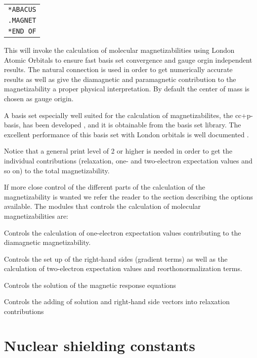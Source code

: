 \smallskip

\begin{tabular}{l}
\verb|*ABACUS|\\
\verb|.MAGNET|\\
\verb|*END OF|
\end{tabular}

\smallskip

This will invoke the calculation of molecular magnetizabilities using
London Atomic Orbitals to ensure fast basis set convergence and gauge
orgin independent results. The natural connection \cite{joklbkrthpj}
is used in order to get numerically accurate results as well as give
the diamagnetic and paramagnetic contribution to the magnetizability a
proper physical interpretation. By default the center of mass is
chosen as gauge origin.

A basis set especially well suited for the calculation of
magnetizabilites, the cc+p-basis, has been developed
\cite{pdkrthklbpj}, and it is obtainable from the basis set library.
The excellent performance of this basis set with London orbitals is
well documented
\cite{krthklbpjhjajjcp99,krthpjklbcpl223,krhsthklbpjjacs}.

Notice that a general print level of 2 or higher is needed in order to
get the individual contributions (relaxation, one- and
two-electron expectation values and so on) to the total magnetizability.

If more close control of the different parts of the calculation of the
magnetizability is wanted we refer the reader to the section
describing the options available. The modules that controls the
calculation of molecular magnetizabilities are:

\begin{list}{}{\itemsep 0.10cm \parsep 0.0cm}
\item[\verb|*EXPECT|] Controls the calculation of one-electron
expectation values contributing to the diamagnetic magnetizability.
\item[\verb|*GETSGY|] Controls the set up of the right-hand sides
(gradient terms) as well as the calculation of two-electron
expectation values and reorthonormalization terms.
\item[\verb|*LINRES|] Controls the solution of the magnetic response
equations
\item[\verb|*RELAX |] Controls the adding of solution and right-hand
side vectors into relaxation contributions
\end{list}

\section{Nuclear shielding constants}\label{sec:shieldings}

